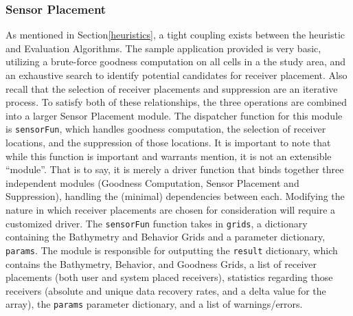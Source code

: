 \subsubsection{Sensor Placement}
As mentioned in Section\ref{heuristics}, a tight coupling exists between the heuristic and Evaluation Algorithms.  The sample application provided is very basic, utilizing a brute-force goodness computation on all cells in a the study area, and an exhaustive search to identify potential candidates for receiver placement.  Also recall that the selection of receiver placements and suppression are an iterative process.  To satisfy both of these relationships, the three operations are combined into a larger Sensor Placement module.  The dispatcher function for this module is \texttt{sensorFun}, which handles goodness computation, the selection of receiver locations, and the suppression of those locations.  It is important to note that while this function is important and warrants mention, it is not an extensible ``module''.  That is to say, it is merely a driver function that binds together three independent modules (Goodness Computation, Sensor Placement and Suppression), handling the (minimal) dependencies between each.  Modifying the nature in which receiver placements are chosen for consideration will require a customized driver.  The \texttt{sensorFun} function takes in \texttt{grids}, a dictionary containing the Bathymetry and Behavior Grids and a parameter dictionary, \texttt{params}.  The module is responsible for outputting the \texttt{result} dictionary, which contains the Bathymetry, Behavior, and Goodness Grids, a list of receiver placements (both user and system placed receivers), statistics regarding those receivers (absolute and unique data recovery rates, and a delta value for the array), the \texttt{params} parameter dictionary, and a list of warnings/errors.

